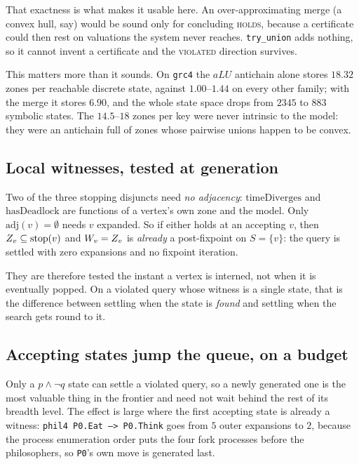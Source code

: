 That exactness is what makes it usable here. An over-approximating merge (a convex hull, say) would
be sound only for concluding \textsc{holds}, because a certificate could then rest on valuations
the system never reaches. \texttt{try\_union} adds nothing, so it cannot invent a certificate and
the \textsc{violated} direction survives.

This matters more than it sounds. On \texttt{grc4} the $aLU$ antichain alone stores $18.32$ zones
per reachable discrete state, against $1.00$--$1.44$ on every other family; with the merge it
stores $6.90$, and the whole state space drops from $2345$ to $883$ symbolic states.
\measured{} The $14.5$--$18$ zones per key were never intrinsic to the model: they were an
antichain full of zones whose pairwise unions happen to be convex.

\subsection{Local witnesses, tested at generation}
\label{sec:otf:local}

Two of the three stopping disjuncts need \emph{no adjacency}: $\mathrm{timeDiverges}$ and
$\mathrm{hasDeadlock}$ are functions of a vertex's own zone and the model. Only
$\mathrm{adj}(v) = \emptyset$ needs $v$ expanded. So if either holds at an accepting $v$, then
$Z_v \subseteq \mathrm{stop}(v)$ and $W_v = Z_v$ is \emph{already} a post-fixpoint on
$S = \{v\}$: the query is settled with zero expansions and no fixpoint iteration.

They are therefore tested the instant a vertex is interned, not when it is eventually popped. On a
violated query whose witness is a single state, that is the difference between settling when the
state is \emph{found} and settling when the search gets round to it.

\subsection{Accepting states jump the queue, on a budget}
\label{sec:otf:order}

Only a $p \wedge \lnot q$ state can settle a violated query, so a newly generated one is the most
valuable thing in the frontier and need not wait behind the rest of its breadth level. The effect
is large where the first accepting state is already a witness: \texttt{phil4 P0.Eat --> P0.Think}
goes from $5$ outer expansions to $2$, because the process enumeration order puts the four fork
processes before the philosophers, so \texttt{P0}'s own move is generated last. \measured{}

